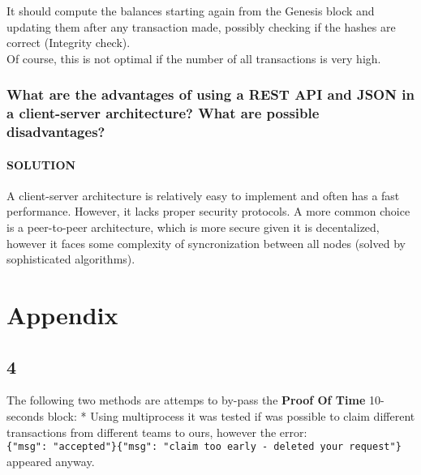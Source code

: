 \documentclass[11pt]{article}
\begin{document}
It should compute the balances starting again from the Genesis block and
updating them after any transaction made, possibly checking if the
hashes are correct (Integrity check).\\
Of course, this is not optimal if the number of all transactions is very
high.

    \hypertarget{what-are-the-advantages-of-using-a-rest-api-and-json-in-a-client-server-architecture-what-are-possible-disadvantages}{%
\subsubsection{What are the advantages of using a REST API and
JSON in a client-server architecture? What are possible
disadvantages?}\label{what-are-the-advantages-of-using-a-rest-api-and-json-in-a-client-server-architecture-what-are-possible-disadvantages}}

    \hypertarget{solution}{%
\paragraph{SOLUTION}\label{solution}}

A client-server architecture is relatively easy to implement and often
has a fast performance. However, it lacks proper security protocols. A
more common choice is a peer-to-peer architecture, which is more secure
given it is decentalized, however it faces some complexity of
syncronization between all nodes (solved by sophisticated algorithms).

    \hypertarget{appendix}{%
\section{Appendix}\label{appendix}}

    \hypertarget{section}{%
\subsection{4}\label{section}}

The following two methods are attemps to by-pass the \textbf{Proof Of
Time} 10-seconds block: * Using multiprocess it was tested if was
possible to claim different transactions from different teams to ours,
however the error:
\texttt{\{"msg":\ "accepted"\}\{"msg":\ "claim\ too\ early\ -\ deleted\ your\ request"\}}
appeared anyway.
\end{document}
